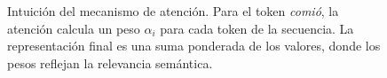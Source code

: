 \begin{figure}[H]
\caption{Intuici\'on del mecanismo de atenci\'on. Para el token
\textit{comi\'o}, la atenci\'on calcula un peso $\alpha_i$ para cada
token de la secuencia. La representaci\'on final es una suma ponderada
de los valores, donde los pesos reflejan la relevancia sem\'antica.}
\label{fig:atencion_intuicion}
\end{figure}
